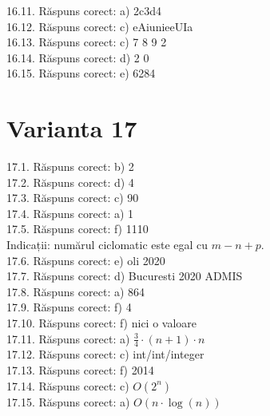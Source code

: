 16.11. Răspuns corect: a) 2c3d4\\

16.12. Răspuns corect: c) eAiunieeUIa\\

16.13. Răspuns corect: c) 7 8 9 2\\

16.14. Răspuns corect: d) 2 0\\

16.15. Răspuns corect: e) 6284\\

\section*{Varianta 17}

17.1. Răspuns corect: b) 2\\

17.2. Răspuns corect: d) 4\\

17.3. Răspuns corect: c) 90\\

17.4. Răspuns corect: a) 1\\

17.5. Răspuns corect: f) 1110\\
Indicații: numărul ciclomatic este egal cu $m-n+p$.\\

17.6. Răspuns corect: e) oli 2020\\

17.7. Răspuns corect: d) Bucuresti 2020 ADMIS\\

17.8. Răspuns corect: a) 864\\

17.9. Răspuns corect: f) 4\\

17.10. Răspuns corect: f) nici o valoare\\

17.11. Răspuns corect: a) $\frac{3}{4} \cdot(n+1) \cdot n$\\

17.12. Răspuns corect: c) int/int/integer\\

17.13. Răspuns corect: f) 2014\\

17.14. Răspuns corect: c) $O\left(2^{n}\right)$\\

17.15. Răspuns corect: a) $O(n \cdot \log (n))$\\

